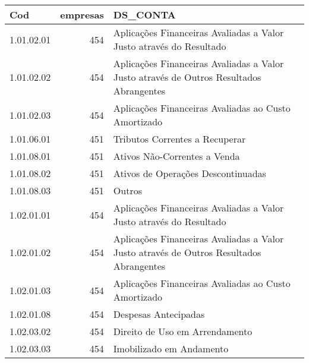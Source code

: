 \begin{table}[ht]
\centering
\begin{tabular}{lrl}
  \hline
Cod & empresas & DS\_CONTA \\ 
  \hline
1.01.02.01 & 454 & Aplicações Financeiras Avaliadas a Valor Justo através do Resultado \\ 
  1.01.02.02 & 454 & Aplicações Financeiras Avaliadas a Valor Justo através de Outros Resultados Abrangentes \\ 
  1.01.02.03 & 454 & Aplicações Financeiras Avaliadas ao Custo Amortizado \\ 
  1.01.06.01 & 451 & Tributos Correntes a Recuperar \\ 
  1.01.08.01 & 451 & Ativos Não-Correntes a Venda \\ 
  1.01.08.02 & 451 & Ativos de Operações Descontinuadas \\ 
  1.01.08.03 & 451 & Outros \\ 
  1.02.01.01 & 454 & Aplicações Financeiras Avaliadas a Valor Justo através do Resultado \\ 
  1.02.01.02 & 454 & Aplicações Financeiras Avaliadas a Valor Justo através de Outros Resultados Abrangentes \\ 
  1.02.01.03 & 454 & Aplicações Financeiras Avaliadas ao Custo Amortizado \\ 
  1.02.01.08 & 454 & Despesas Antecipadas \\ 
  1.02.03.02 & 454 & Direito de Uso em Arrendamento \\ 
  1.02.03.03 & 454 & Imobilizado em Andamento \\ 
   \hline
\end{tabular}
\end{table}
